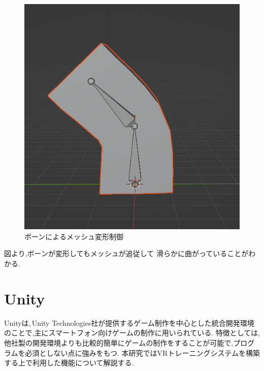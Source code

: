 \documentclass{ltjsreport}
\begin{document}
\begin{figure}[H]
\begin{minipage}{0.25\columnwidth}
			\includegraphics[width = \columnwidth]{../figs/bonecheck.png}
			\end{minipage}
			\caption{ボーンによるメッシュ変形制御}
			\label{fig:bonecontrol}
			\end{figure}
\vspace{-15pt}

		図より,ボーンが変形してもメッシュが追従して
		滑らかに曲がっていることがわかる.

	\section{Unity}
		Unityは,\,Unity Technologies社が提供するゲーム制作を中心とした統合開発環境のことで,主にスマートフォン向けゲームの制作に用いられている.
		特徴としては,他社製の開発環境よりも比較的簡単にゲームの制作をすることが可能で,プログラムを必須としない点に強みをもつ.
		本研究ではVRトレーニングシステムを構築する上で利用した機能について解説する.
\end{document}

